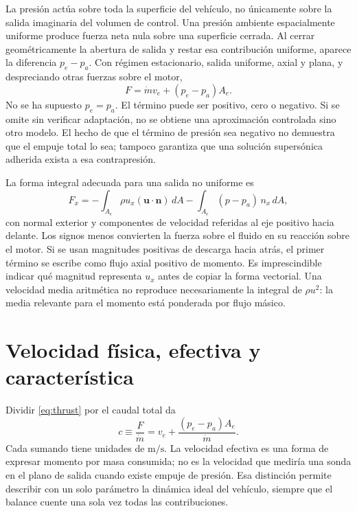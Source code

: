 La presión actúa sobre toda la superficie del vehículo, no únicamente sobre la salida imaginaria del volumen de control. Una presión ambiente espacialmente uniforme produce fuerza neta nula sobre una superficie cerrada. Al cerrar geométricamente la abertura de salida y restar esa contribución uniforme, aparece la diferencia $p_e-p_a$. Con régimen estacionario, salida uniforme, axial y plana, y despreciando otras fuerzas sobre el motor,
\begin{equation}\label{eq:thrust}
 F=\dot m v_e+(p_e-p_a)A_e.
\end{equation}
No se ha supuesto $p_e=p_a$. El término puede ser positivo, cero o negativo. Si se omite sin verificar adaptación, no se obtiene una aproximación controlada sino otro modelo. El hecho de que el término de presión sea negativo no demuestra que el empuje total lo sea; tampoco garantiza que una solución supersónica adherida exista a esa contrapresión.

La forma integral adecuada para una salida no uniforme es
\begin{equation}
 F_x=-\int_{A_e}\rho u_x(\mathbf u\cdot\mathbf n)\,dA-
 \int_{A_e}(p-p_a)\,n_x\,dA,
\end{equation}
con normal exterior y componentes de velocidad referidas al eje positivo hacia delante. Los signos menos convierten la fuerza sobre el fluido en su reacción sobre el motor. Si se usan magnitudes positivas de descarga hacia atrás, el primer término se escribe como flujo axial positivo de momento. Es imprescindible indicar qué magnitud representa $u_x$ antes de copiar la forma vectorial. Una velocidad media aritmética no reproduce necesariamente la integral de $\rho u^2$: la media relevante para el momento está ponderada por flujo másico.\cite{MIT02,NASA-THRUST}
\section{Velocidad física, efectiva y característica}
Dividir \eqref{eq:thrust} por el caudal total da
\begin{equation}\label{eq:ceff}
 c\equiv\frac{F}{\dot m}=v_e+\frac{(p_e-p_a)A_e}{\dot m}.
\end{equation}
Cada sumando tiene unidades de $\mathrm{m/s}$. La velocidad efectiva es una forma de expresar momento por masa consumida; no es la velocidad que mediría una sonda en el plano de salida cuando existe empuje de presión. Esa distinción permite describir con un solo parámetro la dinámica ideal del vehículo, siempre que el balance cuente una sola vez todas las contribuciones.

